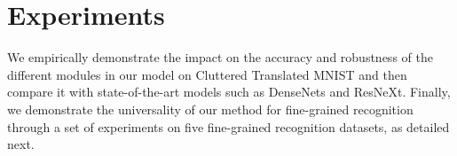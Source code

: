 \documentclass[runningheads]{llncs}
\begin{document}
\iffalse
\subsection{Regularization of the Attention Heads}
Since the different attention heads in an attention module can learn to focus on the same exact part of the image, similarly to \cite{zhao2017diversified}, we have introduced a regularization loss  that forces the multiple masks to be different. In order to simplify the notation, we set  to be  flattened version of the attention mask  in Equation \ref{eq:atthead1}. Then, the regularization loss is expressed as:



\emph{i.e.}, it minimizes the squared Frobenius norm of the off-diagonal cross-correlation matrix formed by the squared inner product of each pair of different attention masks, pushing them towards orthogonality (). This loss is added to the network loss  weighted by a constant factor  which was found to work best across all tasks:



\fi

\section{Experiments}
We empirically demonstrate the impact on the accuracy and robustness of the different modules in our model on Cluttered Translated MNIST and then compare it with state-of-the-art models such as DenseNets and ResNeXt. Finally, we demonstrate the universality of our method for fine-grained recognition through a set of experiments on five fine-grained recognition datasets, as detailed next.
\end{document}
